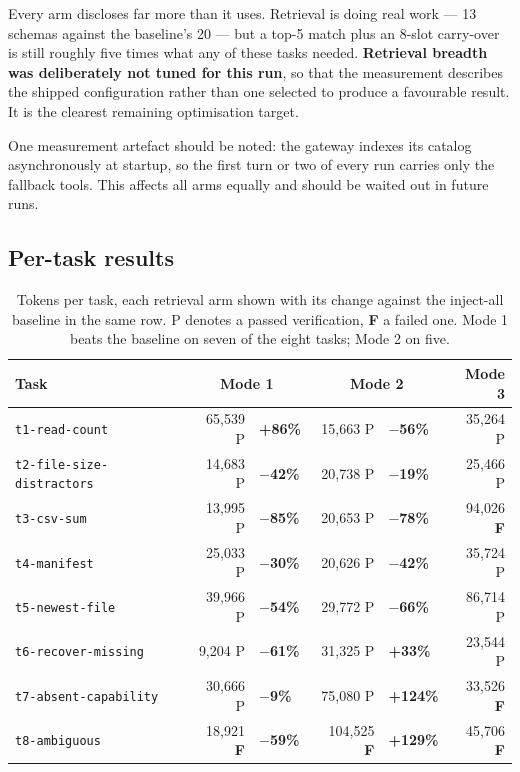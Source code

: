 \documentclass[11pt,a4paper]{article}
\newcommand{\gain}[1]{\textcolor{gaingreen}{\textbf{$-$#1\%}}}
\newcommand{\loss}[1]{\textcolor{lossred}{\textbf{+#1\%}}}
\begin{document}
Every arm discloses far more than it uses. Retrieval is doing real work --- 13 schemas against the
baseline's 20 --- but a top-5 match plus an 8-slot carry-over is still roughly five times what any of
these tasks needed. \textbf{Retrieval breadth was deliberately not tuned for this run}, so that the
measurement describes the shipped configuration rather than one selected to produce a favourable
result. It is the clearest remaining optimisation target.

One measurement artefact should be noted: the gateway indexes its catalog asynchronously at startup,
so the first turn or two of every run carries only the fallback tools. This affects all arms equally
and should be waited out in future runs.

\subsection{Per-task results}

\begin{table}[h]
\centering
\small
\begin{tabular}{@{}lrlrlr@{}}
\toprule
\textbf{Task} & \multicolumn{2}{c}{\textbf{Mode 1}} & \multicolumn{2}{c}{\textbf{Mode 2}} & \textbf{Mode 3} \\
\midrule
\texttt{t1-read-count}            & 65,539 P & \loss{86} & 15,663 P & \gain{56} & 35,264 P \\
\texttt{t2-file-size-distractors} & 14,683 P & \gain{42} & 20,738 P & \gain{19} & 25,466 P \\
\texttt{t3-csv-sum}               & 13,995 P & \gain{85} & 20,653 P & \gain{78} & 94,026 \textbf{F} \\
\texttt{t4-manifest}              & 25,033 P & \gain{30} & 20,626 P & \gain{42} & 35,724 P \\
\texttt{t5-newest-file}           & 39,966 P & \gain{54} & 29,772 P & \gain{66} & 86,714 P \\
\texttt{t6-recover-missing}       &  9,204 P & \gain{61} & 31,325 P & \loss{33} & 23,544 P \\
\texttt{t7-absent-capability}     & 30,666 P & \gain{9}  & 75,080 P & \loss{124} & 33,526 \textbf{F} \\
\texttt{t8-ambiguous}             & 18,921 \textbf{F} & \gain{59} & 104,525 \textbf{F} & \loss{129} & 45,706 \textbf{F} \\
\bottomrule
\end{tabular}
\caption{Tokens per task, each retrieval arm shown with its change against the inject-all baseline
in the same row. P denotes a passed verification, \textbf{F} a failed one. Mode 1 beats the baseline
on seven of the eight tasks; Mode 2 on five.}
\label{tab:pertask}
\end{table}
\end{document}
